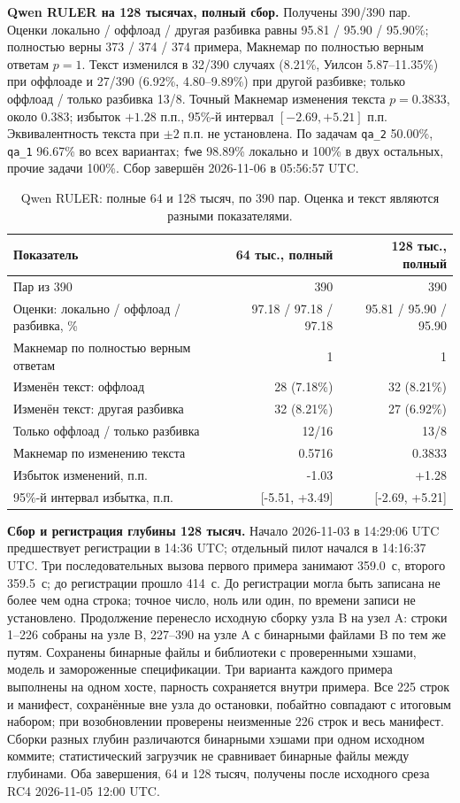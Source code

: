 \textbf{Qwen RULER на 128 тысячах, полный сбор.} Получены 390/390 пар.
Оценки локально / оффлоад / другая разбивка равны 95.81 / 95.90 / 95.90\%;
полностью верны 373 / 374 / 374 примера, Макнемар по полностью верным ответам $p=1$.
Текст изменился в 32/390 случаях (8.21\%, Уилсон 5.87--11.35\%) при оффлоаде
и 27/390 (6.92\%, 4.80--9.89\%) при другой разбивке; только оффлоад / только разбивка 13/8.
Точный Макнемар изменения текста $p=0.3833$, около 0.383; избыток $+1.28$ п.п.,
95\%-й интервал $[-2.69,+5.21]$ п.п. Эквивалентность текста при $\pm2$ п.п. не установлена.
По задачам \texttt{qa\_2} 50.00\%, \texttt{qa\_1} 96.67\% во всех вариантах;
\texttt{fwe} 98.89\% локально и 100\% в двух остальных, прочие задачи 100\%.
Сбор завершён 2026-11-06 в 05:56:57 UTC.

\begin{table}[t]
\centering
\caption{Qwen RULER: полные 64 и 128 тысяч, по 390 пар. Оценка и текст являются разными показателями.}
\label{tab:ruler-interim}
\footnotesize
\begin{tabular}{lrr}
\toprule
Показатель & 64 тыс., полный & 128 тыс., полный \\
\midrule
Пар из 390 & 390 & 390 \\
Оценки: локально / оффлоад / разбивка, \% & 97.18 / 97.18 / 97.18 & 95.81 / 95.90 / 95.90 \\
Макнемар по полностью верным ответам & 1 & 1 \\
Изменён текст: оффлоад & 28 (7.18\%) & 32 (8.21\%) \\
Изменён текст: другая разбивка & 32 (8.21\%) & 27 (6.92\%) \\
Только оффлоад / только разбивка & 12/16 & 13/8 \\
Макнемар по изменению текста & 0.5716 & 0.3833 \\
Избыток изменений, п.п. & -1.03 & +1.28 \\
95\%-й интервал избытка, п.п. & [-5.51, +3.49] & [-2.69, +5.21] \\
\bottomrule
\end{tabular}
\end{table}

\textbf{Сбор и регистрация глубины 128 тысяч.} Начало 2026-11-03 в 14:29:06 UTC предшествует
регистрации в 14:36 UTC; отдельный пилот начался в 14:16:37 UTC.
Три последовательных вызова первого примера занимают 359.0~с, второго 359.5~с;
до регистрации прошло 414~с. До регистрации могла быть записана не более чем одна строка;
точное число, ноль или один, по времени записи не установлено.
Продолжение перенесло исходную сборку узла B на узел A: строки 1--226 собраны на узле B,
227--390 на узле A с бинарными файлами B по тем же путям.
Сохранены бинарные файлы и библиотеки с проверенными хэшами, модель и замороженные спецификации.
Три варианта каждого примера выполнены на одном хосте, парность сохраняется внутри примера.
Все 225 строк и манифест, сохранённые вне узла до остановки, побайтно совпадают с итоговым набором;
при возобновлении проверены неизменные 226 строк и весь манифест.
Сборки разных глубин различаются бинарными хэшами при одном исходном коммите;
статистический загрузчик не сравнивает бинарные файлы между глубинами.
Оба завершения, 64 и 128 тысяч, получены после исходного среза RC4 2026-11-05 12:00 UTC.

